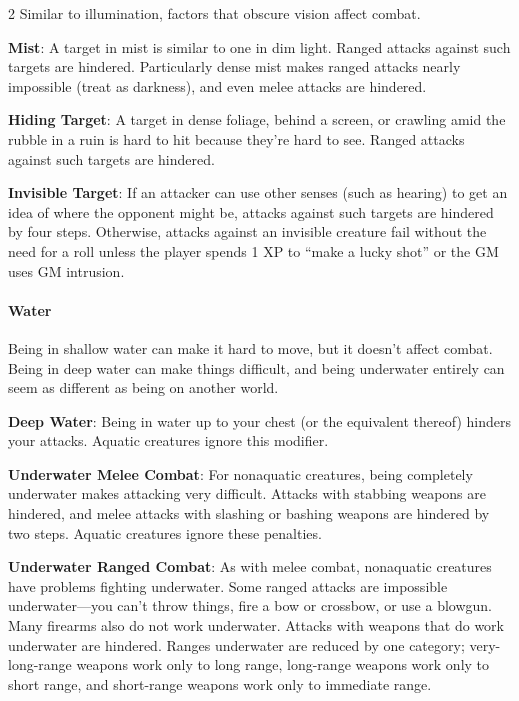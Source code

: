 \begin{multicols}{2}
Similar to illumination, factors that obscure vision affect combat.

\textbf{Mist}: A target in mist is similar to one in dim light. Ranged attacks against such targets are hindered. Particularly dense mist makes ranged attacks nearly impossible (treat as darkness), and even melee attacks are hindered.

\textbf{Hiding Target}: A target in dense foliage, behind a screen, or crawling amid the rubble in a ruin is hard to hit because they’re hard to see. Ranged attacks against such targets are hindered.

\textbf{Invisible Target}: If an attacker can use other senses (such as hearing) to get an idea of where the opponent might be, attacks against such targets are hindered by four steps. Otherwise, attacks against an invisible creature fail without the need for a roll unless the player spends 1 XP to “make a lucky shot” or the GM uses GM intrusion.

\paragraph{Water}

Being in shallow water can make it hard to move, but it doesn’t affect combat. Being in deep water can make things difficult, and being underwater entirely can seem as different as being on another world.

\textbf{Deep Water}: Being in water up to your chest (or the equivalent thereof) hinders your attacks. Aquatic creatures ignore this modifier.

\textbf{Underwater Melee Combat}: For nonaquatic creatures, being completely underwater makes attacking very difficult. Attacks with stabbing weapons are hindered, and melee attacks with slashing or bashing weapons are hindered by two steps. Aquatic creatures ignore these penalties.

\textbf{Underwater Ranged Combat}: As with melee combat, nonaquatic creatures have problems fighting underwater. Some ranged attacks are impossible underwater—you can’t throw things, fire a bow or crossbow, or use a blowgun. Many firearms also do not work underwater. Attacks with weapons that do work underwater are hindered. Ranges underwater are reduced by one category; very-long-range weapons work only to long range, long-range weapons work only to short range, and short-range weapons work only to immediate range.


\end{multicols}
